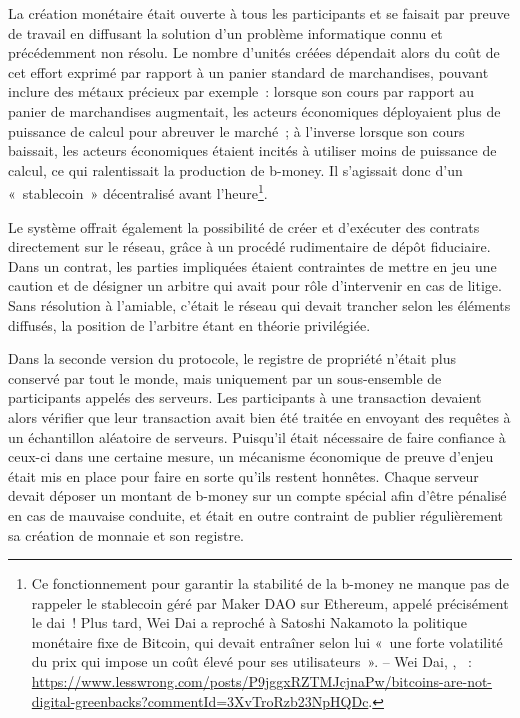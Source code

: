 La création monétaire était ouverte à tous les participants et se faisait par preuve de travail en diffusant la solution d'un problème informatique connu et précédemment non résolu. Le nombre d'unités créées dépendait alors du coût de cet effort exprimé par rapport à un panier standard de marchandises, pouvant inclure des métaux précieux par exemple~: lorsque son cours par rapport au panier de marchandises augmentait, les acteurs économiques déployaient plus de puissance de calcul pour abreuver le marché~; à l'inverse lorsque son cours baissait, les acteurs économiques étaient incités à utiliser moins de puissance de calcul, ce qui ralentissait la production de b-money. Il s'agissait donc d'un «~stablecoin~» décentralisé avant l'heure\footnote{Ce fonctionnement pour garantir la stabilité de la b-money ne manque pas de rappeler le stablecoin géré par Maker DAO sur Ethereum, appelé précisément le dai~! Plus tard, Wei Dai a reproché à Satoshi Nakamoto la politique monétaire fixe de Bitcoin, qui devait entraîner selon lui «~une forte volatilité du prix qui impose un coût élevé pour ses utilisateurs~». -- Wei Dai, , ~: \url{https://www.lesswrong.com/posts/P9jggxRZTMJcjnaPw/bitcoins-are-not-digital-greenbacks?commentId=3XvTroRzb23NpHQDc}.}. %

Le système offrait également la possibilité de créer et d'exécuter des contrats directement sur le réseau, grâce à un procédé rudimentaire de dépôt fiduciaire. Dans un contrat, les parties impliquées étaient contraintes de mettre en jeu une caution et de désigner un arbitre qui avait pour rôle d'intervenir en cas de litige. Sans résolution à l'amiable, c'était le réseau qui devait trancher selon les éléments diffusés, la position de l'arbitre étant en théorie privilégiée.

Dans la seconde version du protocole, le registre de propriété n'était plus conservé par tout le monde, mais uniquement par un sous-ensemble de participants appelés des serveurs. Les participants à une transaction devaient alors vérifier que leur transaction avait bien été traitée en envoyant des requêtes à un échantillon aléatoire de serveurs. Puisqu'il était nécessaire de faire confiance à ceux-ci dans une certaine mesure, un mécanisme économique de preuve d'enjeu était mis en place pour faire en sorte qu'ils restent honnêtes. Chaque serveur devait déposer un montant de b-money sur un compte spécial afin d'être pénalisé en cas de mauvaise conduite, et était en outre contraint de publier régulièrement sa création de monnaie et son registre.

